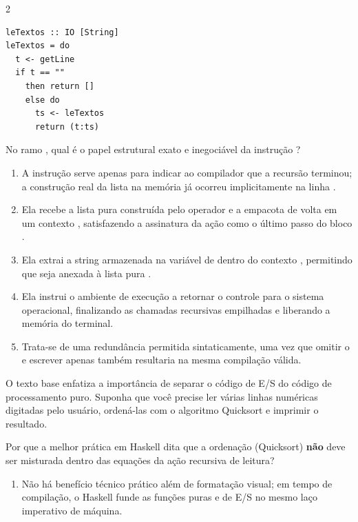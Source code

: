 \documentclass[a4paper,10pt,brazil]{article}
\begin{document}
\begin{multicols}{2}
\begin{verbatim}
leTextos :: IO [String]
leTextos = do
  t <- getLine
  if t == "" 
    then return []
    else do
      ts <- leTextos
      return (t:ts)
\end{verbatim}

No ramo , qual é o papel estrutural exato e inegociável da instrução ?

\begin{enumerate}
  \item A instrução  serve apenas para indicar ao compilador que a recursão terminou; a construção real da lista na memória já ocorreu implicitamente na linha .

  \item Ela recebe a lista pura construída pelo operador \haskellinline{(:)} e a empacota de volta em um contexto , satisfazendo a assinatura da ação como o último passo do bloco .

  \item Ela extrai a string armazenada na variável  de dentro do contexto , permitindo que seja anexada à lista pura .

  \item Ela instrui o ambiente de execução a retornar o controle para o sistema operacional, finalizando as chamadas recursivas empilhadas e liberando a memória do terminal.

  \item Trata-se de uma redundância permitida sintaticamente, uma vez que omitir o  e escrever apenas  também resultaria na mesma compilação válida.


\end{enumerate}

O texto base enfatiza a importância de separar o código de E/S do código de processamento puro. Suponha que você precise ler várias linhas numéricas digitadas pelo usuário, ordená-las com o algoritmo Quicksort e imprimir o resultado. 

Por que a melhor prática em Haskell dita que a ordenação (Quicksort) \textbf{não} deve ser misturada dentro das equações da ação recursiva de leitura?

\begin{enumerate}
  \item Não há benefício técnico prático além de formatação visual; em tempo de compilação, o Haskell funde as funções puras e de E/S no mesmo laço imperativo de máquina.


\end{enumerate}
\end{multicols}
\end{document}
